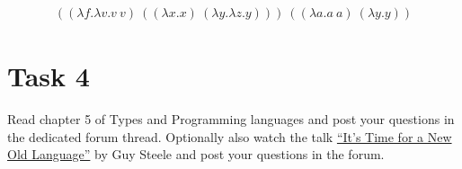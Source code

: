 \begin{align*}
  ((\lambda f.\lambda v.v\ v)\ ((\lambda x.x)\ (\lambda y.\lambda z.y)))\ ((\lambda a.a\ a)\ (\lambda y.y)) 
\end{align*}
%

\section*{Task 4}
Read chapter 5 of Types and Programming languages and post your questions in the dedicated forum thread.
Optionally also watch the talk \href{https://www.youtube.com/watch?v=dCuZkaaou0Q}{``It's Time for a New Old Language''} by Guy Steele and post your questions in the forum.
